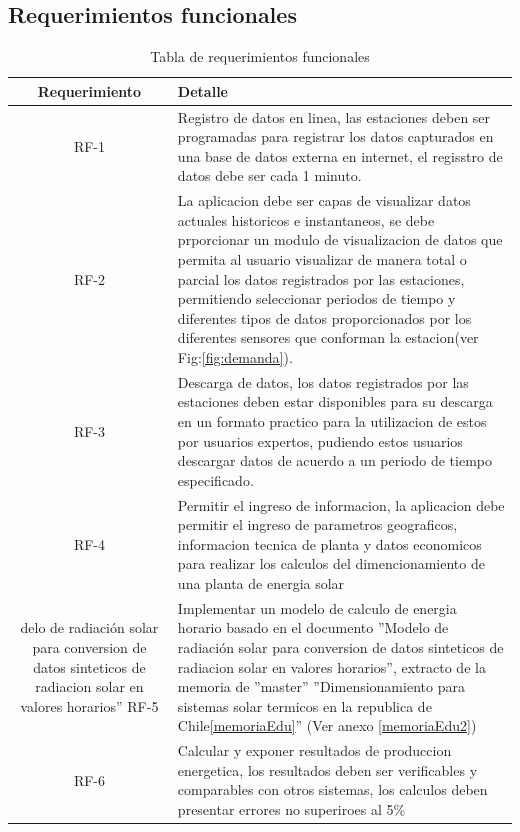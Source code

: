 \subsection{Requerimientos funcionales}
\begin{table}[h!]
\caption{Tabla de requerimientos funcionales}
\label{tablaFuncional}
\begin{tabular}{| c | p{11cm} |}
	\hline
	\textbf{Requerimiento}	&	\textbf{Detalle}	\\
	\hline
	RF-1	&	Registro de datos en linea, las estaciones deben ser programadas para registrar los datos capturados en una base de datos externa en internet, el regisstro de datos debe ser cada 1 minuto.	\\
	\hline
	RF-2	&	La aplicacion debe ser capas de visualizar datos actuales historicos e instantaneos, se debe prporcionar un modulo de visualizacion de datos que permita al usuario visualizar de manera total o parcial los datos registrados por las estaciones, permitiendo seleccionar periodos de tiempo y diferentes tipos de datos proporcionados por los diferentes sensores que conforman la estacion(ver Fig:\ref{fig:demanda}). 	\\
	\hline
	RF-3	&	Descarga de datos, los datos registrados por las estaciones deben estar disponibles para su descarga en un formato practico para la utilizacion de estos por usuarios expertos, pudiendo estos usuarios descargar datos de acuerdo a un periodo de tiempo especificado.	\\
	\hline
	RF-4	&	Permitir el ingreso de informacion, la aplicacion debe permitir el ingreso de parametros geograficos, informacion tecnica de planta y datos economicos para realizar los calculos del dimencionamiento de una planta de energia solar 	\\
delo de radiación solar para  conversion de datos sinteticos de radiacion solar en valores horarios''
	\hline
	RF-5	&	Implementar un modelo de calculo de energia horario basado en el documento ''Modelo de radiación solar para conversion de datos sinteticos de radiacion solar en valores horarios'', extracto de la memoria de ''master'' ''Dimensionamiento para sistemas solar termicos en la republica de Chile\ref{memoriaEdu}'' (Ver anexo \ref{memoriaEdu2})\\
	\hline
	RF-6	&	Calcular y exponer resultados de produccion energetica, los resultados deben ser verificables y comparables con otros sistemas, los calculos deben presentar errores no superiroes al 5\%	\\
	\hline
\end{tabular}
\end{table}

